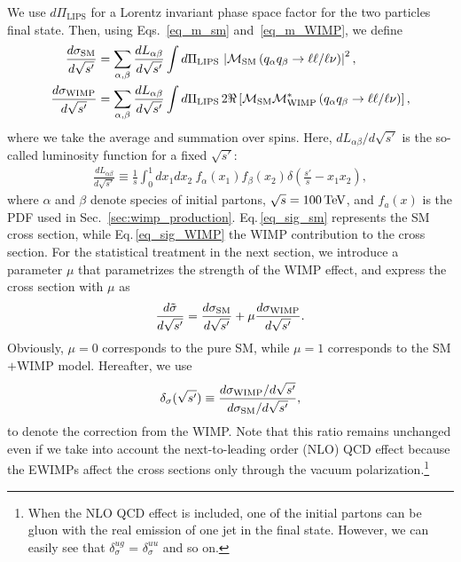 \documentclass[12pt,twoside,book]{article}
\begin{document}
We use $d\Pi_{\mathrm{LIPS}}$ for a Lorentz invariant phase space factor for the two particles final state.
Then, using Eqs.~\eqref{eq_m_sm} and~\eqref{eq_m_WIMP}, we define
\begin{align}
 \frac{d \sigma_{\rm SM}}{d\sqrt{s'}} &= \sum_{\alpha, \beta}
 \frac{dL_{\alpha \beta}}{d\sqrt{s'}} \int d\Pi_{\mathrm{LIPS}}\, \left| \mathcal{M}_{\rm SM} \left( q_\alpha q_\beta \to \ell\ell / \ell\nu \right) \right|^2,\label{eq_sig_sm}\\
 \frac{d \sigma_{\rm WIMP}}{d\sqrt{s'}} &= \sum_{\alpha, \beta}
 \frac{dL_{\alpha \beta}}{d\sqrt{s'}} \int d\Pi_{\mathrm{LIPS}}\, 2 \Re \left[ \mathcal{M}_{\rm SM}
 \mathcal{M}_{\rm WIMP}^{*} \left( q_\alpha q_\beta \to \ell\ell / \ell\nu
 \right) \right],\label{eq_sig_WIMP}
\end{align}
where we take the average and summation over spins.
Here, $dL_{\alpha \beta} / d\sqrt{s'}$ is the so-called luminosity function for a fixed
$\sqrt{s'}$:
\begin{align}
 \frac{d L_{\alpha \beta}}{d\sqrt{s'}} \equiv \frac{1}{s} \int_0^1 dx_1
 dx_2~f_\alpha(x_1) f_\beta(x_2) \delta\left(\frac{s'}{s} - x_1 x_2\right),
\end{align}
where $\alpha$ and $\beta$ denote species of initial partons, $\sqrt{s} = 100\,{\rm TeV}$, and $f_a(x)$ is the PDF used in Sec.~\ref{sec:wimp_production}.
Eq.\,\eqref{eq_sig_sm} represents the SM cross section, while Eq.\,\eqref{eq_sig_WIMP} the WIMP contribution to the cross section.
For the statistical treatment in the next section, we introduce a parameter $\mu$ that parametrizes the strength of the WIMP effect, and express the cross section with $\mu$ as
\begin{align}
 \frac{d\tilde{\sigma}}{d\sqrt{s'}} =
 \frac{d\sigma_{\rm SM}}{d\sqrt{s'}}
 + \mu \frac{d\sigma_{\rm WIMP}}{d\sqrt{s'}}.
 \label{eq_diffcrosssection}
\end{align}
Obviously, $\mu=0$ corresponds to the pure SM, while $\mu=1$ corresponds to the SM$+$WIMP model.
Hereafter, we use
\begin{align}
 \delta_\sigma ( \sqrt{s'} ) \equiv \frac{d\sigma_{\rm
 WIMP} / d\sqrt{s'}}{d\sigma_{\rm SM} /
 d\sqrt{s'}},\label{eq_dsigma}
\end{align}
to denote the correction from the WIMP.
Note that this ratio remains unchanged even if we take into account the next-to-leading order (NLO) QCD effect because the EWIMPs affect the cross sections only through the vacuum polarization.\footnote
{
  When the NLO QCD effect is included, one of the initial partons can be gluon with the real emission of one jet in the final state.
  However, we can easily see that $\delta_\sigma^{ug}$ = $\delta_\sigma^{uu}$ and so on.
}
\end{document}
